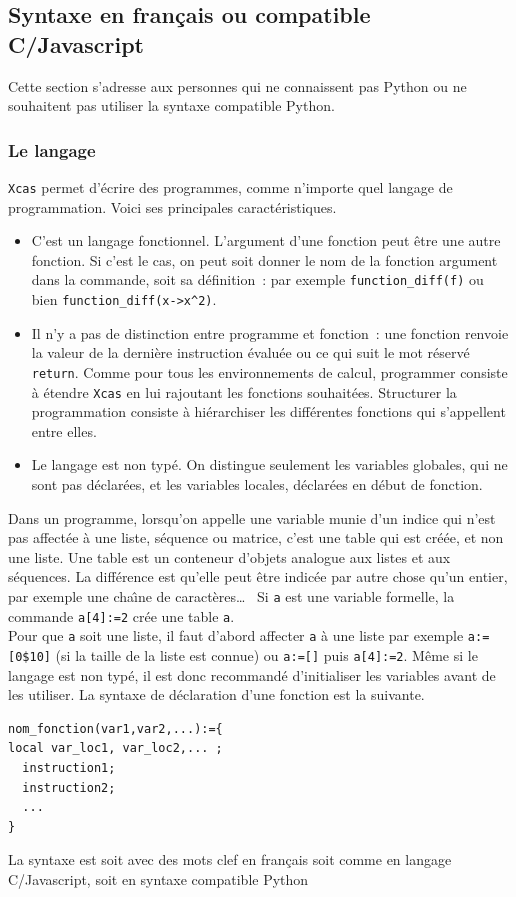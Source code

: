 \documentclass{article}
\begin{document}
\begin{giacjshere}
\subsection{Syntaxe en fran\c{c}ais ou compatible C/Javascript}
%
Cette section s'adresse aux personnes qui ne connaissent pas Python ou
ne souhaitent pas utiliser la syntaxe compatible Python.

\subsubsection{Le langage}
{\tt Xcas} permet d'\'ecrire des  programmes, comme n'importe quel 
langage de programmation. Voici ses
principales caract\'eristiques.
\begin{itemize}
\item
C'est un langage fonctionnel. L'argument d'une fonction peut \^etre
une autre fonction. Si c'est le cas, on peut soit donner le nom de la
fonction argument dans la commande, soit sa d\'efinition~: par exemple
\verb|function_diff(f)| ou bien \verb|function_diff(x->x^2)|.
\item 
Il n'y a pas de distinction entre programme et fonction~: 
une fonction renvoie la valeur de la derni\`ere instruction 
\'evalu\'ee ou ce qui suit le mot r\'eserv\'e \verb|return|.
Comme pour tous les environnements de calcul, programmer
consiste \`a \'etendre {\tt Xcas} en lui rajoutant les fonctions
souhait\'ees. Structurer la programmation consiste \`a hi\'erarchiser
les diff\'erentes fonctions qui s'appellent entre elles.
\item 
Le langage est non typ\'e. On distingue seulement les 
variables globales, qui ne sont pas d\'eclar\'ees, 
et les variables locales, 
d\'eclar\'ees en d\'ebut de fonction.
\end{itemize}
Dans un programme, lorsqu'on appelle une variable munie d'un indice qui n'est 
pas affect\'ee \`a une liste, s\'equence ou matrice, 
c'est une table qui est cr\'e\'ee, et non une liste.
Une table est un conteneur d'objets analogue aux listes et aux
s\'equences. La diff\'erence est qu'elle peut \^etre indic\'ee
par autre chose qu'un entier, par exemple
une cha\^\i ne de caract\`eres\ldots~
Si \verb|a| est une variable formelle, la commande \verb|a[4]:=2|
cr\'ee une table \verb|a|.\\
Pour que \verb|a| soit une liste, il faut d'abord affecter \verb|a|
 \`a une liste par exemple \verb|a:=[0$10]|
(si la taille de la liste est connue) ou \verb|a:=[]| puis 
\verb|a[4]:=2|.
M\^eme si le langage est non typ\'e, il est donc 
recommand\'e d'initialiser
les variables avant de les utiliser.
\noindent
La syntaxe de d\'eclaration d'une fonction est la suivante. 
\begin{verbatim}
nom_fonction(var1,var2,...):={
local var_loc1, var_loc2,... ;
  instruction1;
  instruction2;
  ...
}
\end{verbatim}
La syntaxe  est soit avec des mots clef en 
fran\c{c}ais soit comme en langage C/Javascript, soit en syntaxe compatible Python


\end{giacjshere}
\end{document}
